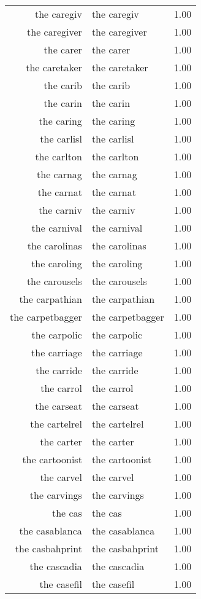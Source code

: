 \begin{table}[ht]
\begin{tabular}{rlr}
  the caregiv & the caregiv & 1.00 \\ 
  the caregiver & the caregiver & 1.00 \\ 
  the carer & the carer & 1.00 \\ 
  the caretaker & the caretaker & 1.00 \\ 
  the carib & the carib & 1.00 \\ 
  the carin & the carin & 1.00 \\ 
  the caring & the caring & 1.00 \\ 
  the carlisl & the carlisl & 1.00 \\ 
  the carlton & the carlton & 1.00 \\ 
  the carnag & the carnag & 1.00 \\ 
  the carnat & the carnat & 1.00 \\ 
  the carniv & the carniv & 1.00 \\ 
  the carnival & the carnival & 1.00 \\ 
  the carolinas & the carolinas & 1.00 \\ 
  the caroling & the caroling & 1.00 \\ 
  the carousels & the carousels & 1.00 \\ 
  the carpathian & the carpathian & 1.00 \\ 
  the carpetbagger & the carpetbagger & 1.00 \\ 
  the carpolic & the carpolic & 1.00 \\ 
  the carriage & the carriage & 1.00 \\ 
  the carride & the carride & 1.00 \\ 
  the carrol & the carrol & 1.00 \\ 
  the carseat & the carseat & 1.00 \\ 
  the cartelrel & the cartelrel & 1.00 \\ 
  the carter & the carter & 1.00 \\ 
  the cartoonist & the cartoonist & 1.00 \\ 
  the carvel & the carvel & 1.00 \\ 
  the carvings & the carvings & 1.00 \\ 
  the cas & the cas & 1.00 \\ 
  the casablanca & the casablanca & 1.00 \\ 
  the casbahprint & the casbahprint & 1.00 \\ 
  the cascadia & the cascadia & 1.00 \\ 
  the casefil & the casefil & 1.00 \\ 

\end{tabular}
\end{table}
